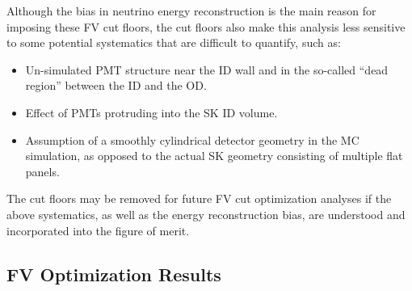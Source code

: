 Although the bias in neutrino energy reconstruction is the main reason for
imposing these FV cut floors, the cut floors also make this analysis less
sensitive to some potential systematics that are difficult to quantify, such
as:
%
\begin{itemize}
  \item Un-simulated PMT structure near the ID wall and in the so-called ``dead
    region'' between the ID and the OD.
  \item Effect of PMTs protruding into the SK ID volume.
  \item Assumption of a smoothly cylindrical detector geometry in the MC
    simulation, as opposed to the actual SK geometry consisting of multiple
    flat panels.
\end{itemize}
%
The cut floors may be removed for future FV cut optimization analyses if the
above systematics, as well as the energy reconstruction bias, are understood and
incorporated into the figure of merit. 



\subsection{FV Optimization Results}
\label{subsec:fvresults}


